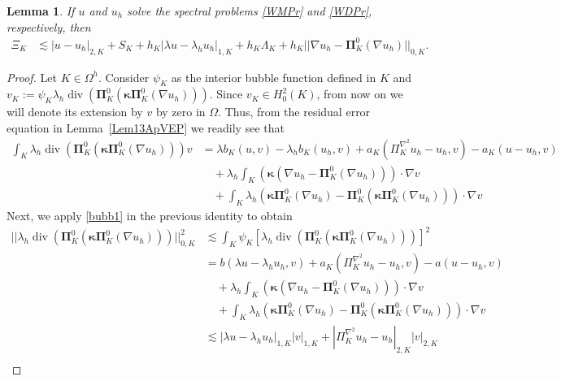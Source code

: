 \documentclass[10pt,a4paper]{amsart}
\newtheorem{lemma}{Lemma}
\def\bPi{\mathbf{\Pi}}
\def\bkappa{\boldsymbol{\kappa}}
\newcommand\vdiv{\mathop{\mathrm{div}}\nolimits}
\begin{document}
\begin{lemma}\label{ApVEPLem18}
    If  $u$ and $u_h$ solve the spectral problems \eqref{WMPr} and \eqref{WDPr}, respectively,  then 
\begin{align}    
\Xi_K&\lesssim  |u-u_h|_{2,K} + S_K + h_K|\lambda u-\lambda_h u_h|_{1,K} + h_K\Lambda_K + h_K ||\nabla u_h - \bPi_K^0 (\nabla u_h)||_{0,K}.\nonumber
\end{align}
\end{lemma}

\begin{proof}
Let $K\in\Omega^h$. Consider $\psi_K$ as the interior bubble function defined in $K$ and  $v_K:=\psi_K\lambda_h\vdiv\left( \bPi_K^0 (\bkappa \bPi_K^0(\nabla u_h))\right)$. Since $v_K\in H_0^2(K)$, from now on we will denote its extension by $v$ by zero in $\Omega$. Thus, from the residual error equation in Lemma~\eqref{Lem13ApVEP} we readily see that
    \begin{align*} 
       \int_{K}\lambda_h \vdiv\left( \bPi_K^0 (\bkappa \bPi_K^0(\nabla u_h))\right) v  &= \lambda b_K(u,v)-\lambda_h b_K( u_h,v) + a_K(\Pi_K^{\nabla^2} u_h-u_h,v) -a_K(u-u_h,v)\\
        &\quad+ \lambda_h  \int_K (\bkappa(\nabla u_h - \bPi_K^0 (\nabla u_h)))\cdot \nabla v  \nonumber\\
        &\quad   + \int_K \lambda_h \left(\bkappa \bPi_K^0(\nabla u_h)-\bPi_K^0(\bkappa \bPi_K^0(\nabla u_h))\right) \cdot \nabla v
    \end{align*}
Next, we apply \eqref{bubb1} in the previous identity to obtain 
    \begin{align}
    ||\lambda_h \vdiv\left( \bPi_K^0 (\bkappa \bPi_K^0(\nabla u_h))\right) ||_{0,K}^2  &\lesssim \int_K \psi_K [\lambda_h \vdiv\left( \bPi_K^0 (\bkappa \bPi_K^0(\nabla u_h))\right)]^2 \nonumber \\ %
        &   = b(\lambda u- \lambda_h u_h,v) +  a_K(\Pi_K^{\nabla^2} u_h-u_h,v)-a(u-u_h,v) \nonumber\\
        &\quad + \lambda_h  \int_K (\bkappa(\nabla u_h - \bPi_K^0 (\nabla u_h)))\cdot \nabla v   \nonumber\\
        &\quad + \int_K \lambda_h \left(\bkappa \bPi_K^0(\nabla u_h)-\bPi_K^0(\bkappa \bPi_K^0(\nabla u_h))\right) \cdot \nabla v\nonumber\\
       & \lesssim |\lambda u-\lambda_h u_h|_{1,K}|v|_{1,K} + |\Pi_K^{\nabla^2} u_h-u_h|_{2,K} |v|_{2,K} \nonumber\\ 

\end{align}
\end{proof}
\end{document}
